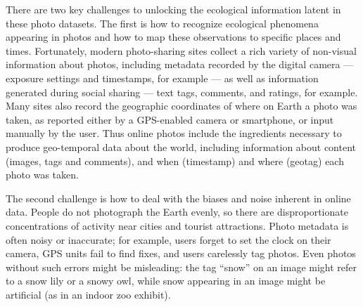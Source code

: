 \documentclass[10pt,journal,compsoc]{IEEEtran}
\begin{document}
There are two key challenges to unlocking the ecological
information latent in these photo datasets. The first is how to recognize 
ecological phenomena appearing in photos and how to map these observations to
specific places and times. Fortunately, modern photo-sharing sites
collect a rich variety of non-visual
information about photos, including metadata recorded by the digital
camera --- exposure settings and timestamps, for example --- as well as
information generated during social sharing  ---
text tags, comments, and ratings, for example. Many sites also
record the
 geographic coordinates of where on Earth a photo was taken, as reported either by a GPS-enabled camera or smartphone, or input manually by the user.
Thus online photos include the ingredients
necessary to produce geo-temporal data about the world,
including information about content (images, tags and comments), and
when (timestamp) and where (geotag) each photo was taken.

The second challenge is how to deal with the biases and noise inherent
in online data. People do not photograph the Earth evenly,
 so there are disproportionate concentrations of
activity near cities and tourist attractions. Photo metadata is often
noisy or inaccurate; for example, users forget to set the clock on
their camera, GPS units fail to find fixes, and users
carelessly tag photos.  Even photos without such errors might be
misleading: the tag ``snow'' on an image might refer to a snow lily or a
snowy owl, while snow appearing in an image might be artificial (as in an indoor zoo exhibit).
\end{document}
